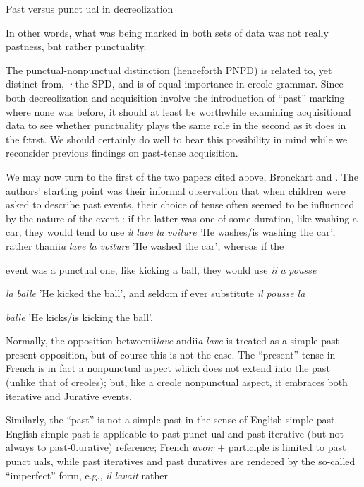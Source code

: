 Past versus punct ual in decreolization

In other words, what was being marked in both sets of data was not really pastness, bnt rather punctuality.

The punctual-nonpunctual distinction (henceforth PNPD) is related to, yet distinct from, ·the SPD, and is of equal importance in creole grammar. Since both decreolization and acquisition involve the introduction of ``past'' marking where none was before, it should at least be worthwhile examining acquisitional data to see whether punctuality plays the same role in the second as it does in the f:trst. We should certainly do well to bear this possibility in mind while we reconsider previous findings on past-tense acquisition.

We may now turn to the first of the two papers cited above, Bronckart and \citet{Sinclair1973}. The authors' starting point was their informal observation that when children were asked to describe past events, their choice of tense often seemed to be influenced by the nature of the event : if the latter was one of some duration, like washing a car, they would tend to use \textit{il} \textit{lave} \textit{la} \textit{voiture} 'He washes/is washing the car', rather thanii\textit{a} \textit{lave} \textit{la} \textit{voiture }'He washed the car'; whereas if the

event was a punctual one, like kicking a ball, they would use \textit{ii} \textit{a} \textit{pousse}

\textit{la} \textit{balle }'He kicked the ball', and seldom if ever substitute \textit{il pousse la}

\textit{balle} 'He kicks/is kicking the ball'.

Normally, the opposition betweenii\textit{lave} andii\textit{a} \textit{lave }is treated as a simple past-present opposition, but of course this is not the case. The ``present'' tense in French is in fact a nonpunctual aspect which does not extend into the past (unlike that of creoles); but, like a creole nonpunctual aspect, it embraces both iterative and Jurative events.


Similarly, the ``past'' is not a simple past in the sense of English simple past. English simple past is applicable to past-punct ual and past-iterative (but not always to past-0.urative) reference; French \textit{avoir} + participle is limited to past punct uals, while past iteratives and past duratives are rendered by the so-called ``imperfect'' form, e.g., \textit{il} \textit{lavait }rather

